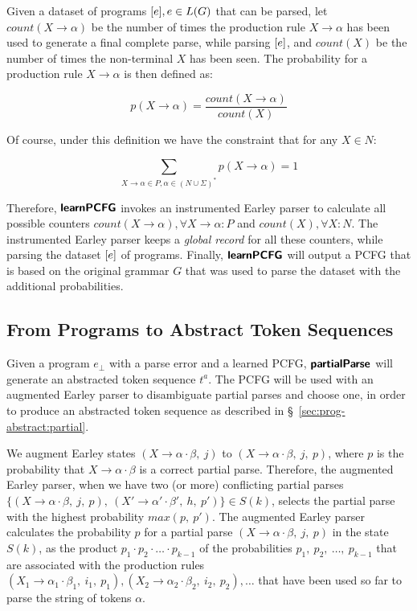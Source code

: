 Given a dataset of programs $[e], e \in L(G)$ that can be parsed, let
$count(X \rightarrow \alpha)$ be the number of times the production rule $X
\rightarrow \alpha$ has been used to generate a final complete parse, while
parsing $[e]$, and $count(X)$ be the number of times the non-terminal $X$
has been seen. The probability for a production rule $X \rightarrow \alpha$ is
then defined as:

\begin{equation*}
    p(X \rightarrow \alpha) = \frac{count(X \rightarrow \alpha)}{count(X)}
\end{equation*}

Of course, under this definition we have the constraint that for any $X \in N$:

\begin{equation*}
    \sum_{X \rightarrow \alpha \in P, \alpha \in (N \cup \Sigma)^{\ast}}{p(X \rightarrow \alpha)} = 1
\end{equation*}

Therefore, $\bm{\mathsf{learnPCFG}}$ invokes an instrumented Earley parser to calculate
all possible counters $count(X \rightarrow \alpha), \forall X \rightarrow
\alpha: P$ and $count(X), \forall X: N$. The instrumented Earley parser keeps a
\emph{global record} for all these counters, while parsing the dataset
$[e]$ of programs. Finally, $\bm{\mathsf{learnPCFG}}$ will output a PCFG that is
based on the original grammar $G$ that was used to parse the dataset with the
additional probabilities.

\subsection{From Programs to Abstract Token Sequences}

Given a program $e_{\bot}$ with a parse error and a learned PCFG, $\bm{\mathsf{partialParse}}$
will generate an abstracted token sequence $t^a$. The PCFG will be used with an
augmented Earley parser to disambiguate partial parses and choose one, in order
to produce an abstracted token sequence as described in
\S~\ref{sec:prog-abstract:partial}.

We augment Earley states $(X \rightarrow \alpha \cdot \beta,\ j)$ to $(X
\rightarrow \alpha \cdot \beta,\ j,\ p)$, where $p$ is the probability that $X
\rightarrow \alpha \cdot \beta$ is a correct partial parse. Therefore, the
augmented Earley parser, when we have two (or more) conflicting partial parses
$\{(X \rightarrow \alpha \cdot \beta,\ j,\ p),\ (X' \rightarrow \alpha' \cdot
\beta',\ h,\ p')\} \in S(k)$, selects the partial parse with the highest
probability $max(p,\ p')$. The augmented Earley parser calculates the
probability $p$ for a partial parse $(X \rightarrow \alpha \cdot \beta,\ j,\ p)$
in the state $S(k)$, as the product $p_1 \cdot p_2 \cdot \dots \cdot p_{k-1}$ of
the probabilities $p_1,\ p_2,\ \dots,\ p_{k-1}$ that are associated with the
production rules $(X_1 \rightarrow \alpha_1 \cdot \beta_1,\ i_1,\ p_1), (X_2
\rightarrow \alpha_2 \cdot \beta_2,\ i_2,\ p_2), \dots$ that have been used so
far to parse the string of tokens $\alpha$.




